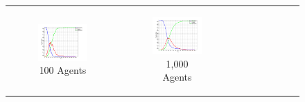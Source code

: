 \begin{figure}
\begin{center}
	\begin{tabular}{c c c}
		\begin{subfigure}[b]{0.3\textwidth}
			\centering
			\includegraphics[width=1\textwidth, angle=0]{./../shared/fig/frabs/SIR_100agents_150t_01dt_parallel.png}
			\caption{100 Agents}
			\label{fig:pd_seq}
		\end{subfigure}
    	&
		\begin{subfigure}[b]{0.3\textwidth}
			\centering
			\includegraphics[width=1\textwidth, angle=0]{./../shared/fig/frabs/SIR_1000agents_150t_01dt_parallel.png}
			\caption{1,000 Agents}
			\label{fig:pd_seq}
		\end{subfigure}
    	&
		\begin{subfigure}[b]{0.3\textwidth}

\end{subfigure}
\end{tabular}
\end{center}
\end{figure}
